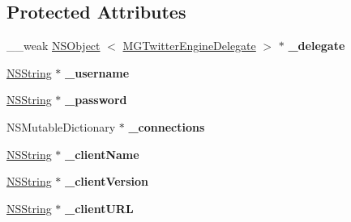 \subsection*{\-Protected \-Attributes}
\begin{DoxyCompactItemize}
\item 
\hypertarget{interface_m_g_twitter_engine_ab314e5fae31607b25da3ea8bfc25a69e}{
\-\_\-\-\_\-weak \hyperlink{class_n_s_object}{\-N\-S\-Object}\*
$<$ \hyperlink{protocol_m_g_twitter_engine_delegate-p}{\-M\-G\-Twitter\-Engine\-Delegate} $>$ $\ast$ {\bfseries \-\_\-delegate}}
\label{interface_m_g_twitter_engine_ab314e5fae31607b25da3ea8bfc25a69e}

\item 
\hypertarget{interface_m_g_twitter_engine_a5708f975070b54da6c0c6ce0d30e4960}{
\hyperlink{class_n_s_string}{\-N\-S\-String} $\ast$ {\bfseries \-\_\-username}}
\label{interface_m_g_twitter_engine_a5708f975070b54da6c0c6ce0d30e4960}

\item 
\hypertarget{interface_m_g_twitter_engine_a4a39262fab5f70c6859565377d3b6354}{
\hyperlink{class_n_s_string}{\-N\-S\-String} $\ast$ {\bfseries \-\_\-password}}
\label{interface_m_g_twitter_engine_a4a39262fab5f70c6859565377d3b6354}

\item 
\hypertarget{interface_m_g_twitter_engine_a41a790d86f0e7398e307427411b13c45}{
\-N\-S\-Mutable\-Dictionary $\ast$ {\bfseries \-\_\-connections}}
\label{interface_m_g_twitter_engine_a41a790d86f0e7398e307427411b13c45}

\item 
\hypertarget{interface_m_g_twitter_engine_a7b30f426c92f61a1ec3da5a896937e60}{
\hyperlink{class_n_s_string}{\-N\-S\-String} $\ast$ {\bfseries \-\_\-client\-Name}}
\label{interface_m_g_twitter_engine_a7b30f426c92f61a1ec3da5a896937e60}

\item 
\hypertarget{interface_m_g_twitter_engine_ae38809c229922ad7c85828ed75d2c76d}{
\hyperlink{class_n_s_string}{\-N\-S\-String} $\ast$ {\bfseries \-\_\-client\-Version}}
\label{interface_m_g_twitter_engine_ae38809c229922ad7c85828ed75d2c76d}

\item 
\hypertarget{interface_m_g_twitter_engine_a36f796051798839fa5dd4427b7c2a788}{
\hyperlink{class_n_s_string}{\-N\-S\-String} $\ast$ {\bfseries \-\_\-client\-U\-R\-L}}
\label{interface_m_g_twitter_engine_a36f796051798839fa5dd4427b7c2a788}


\end{DoxyCompactItemize}
